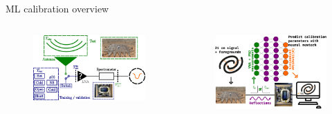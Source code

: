 \documentclass[aspectratio=169]{beamer}
\begin{document}
\begin{frame}{\small{ML calibration overview}}
	\begin{columns}
		\begin{column}{0.48\textwidth}
			\begin{figure}
				\centering
				\includegraphics[width=\textwidth]{images/instrument.png}
			\end{figure}
		\end{column}

		\begin{column}{0.48\textwidth}
			\begin{figure}
				\centering
				\includegraphics[width=\textwidth]{images/ml_overview.png}
			\end{figure}
		\end{column}
	\end{columns}
\end{frame}
\end{document}

